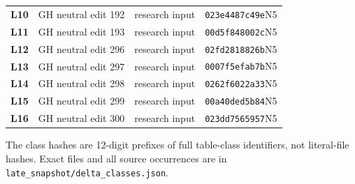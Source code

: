 \begin{longtable}{@{}>{\raggedright\arraybackslash}p{.07\linewidth}>{\raggedright\arraybackslash}p{.40\linewidth}>{\raggedright\arraybackslash}p{.24\linewidth}>{\raggedright\arraybackslash}p{.22\linewidth}@{}}
\textbf{L10} & GH neutral edit 192 & research input & \texttt{023e4487c49e}\newline N5\\[4pt]
\textbf{L11} & GH neutral edit 193 & research input & \texttt{00d5f848002c}\newline N5\\[4pt]
\textbf{L12} & GH neutral edit 296 & research input & \texttt{02fd2818826b}\newline N5\\[4pt]
\textbf{L13} & GH neutral edit 297 & research input & \texttt{0007f5efab7b}\newline N5\\[4pt]
\textbf{L14} & GH neutral edit 298 & research input & \texttt{0262f6022a33}\newline N5\\[4pt]
\textbf{L15} & GH neutral edit 299 & research input & \texttt{00a40ded5b84}\newline N5\\[4pt]
\textbf{L16} & GH neutral edit 300 & research input & \texttt{023dd7565957}\newline N5\\[4pt]
\end{longtable}
\endgroup
The class hashes are 12-digit prefixes of full table-class identifiers, not literal-file hashes. Exact files and all source occurrences are in \nolinkurl{late_snapshot/delta_classes.json}.
